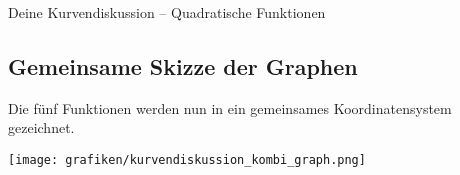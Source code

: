 \begin{loesungsumgebung}{Deine Kurvendiskussion – Quadratische Funktionen}
\subsection*{Gemeinsame Skizze der Graphen}
Die fünf Funktionen werden nun in ein gemeinsames Koordinatensystem gezeichnet.

\begin{center}
\texttt{[image: grafiken/kurvendiskussion\_kombi\_graph.png]}
\label{fig:kurvendiskussion_kombi}
\end{center}

\end{loesungsumgebung}



